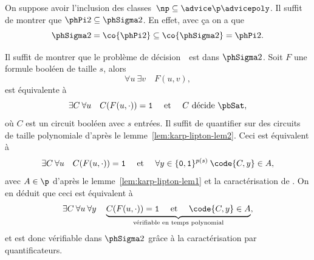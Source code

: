 \documentclass[./main]{subfiles}
\begin{document}
  \vspace{12pt}

  \begin{prv}
    On suppose avoir l'inclusion des classes~$\np \subseteq \advice \p \advicepoly$.
    Il suffit de montrer que $\phPi 2 \subseteq \phSigma 2$.
    En effet, avec ça on a que
    \[
      \phSigma 2 = \co {\phPi 2} \subseteq \co {\phSigma 2} = \phPi 2
    .\]

    \renewcommand\vali{2}%

    Il suffit de montrer que le problème de décision~\pbQBFPi\ est dans $\phSigma 2$.
    Soit $F$ une formule booléen de taille $s$, alors
    \[
    \forall u \: \exists v \quad F(u, v)
    ,\] 
    est équivalente à 
    \[
    \exists C \: \forall u \quad C(F(u, \cdot)) = \texttt{1} \quad \text{ et }\quad \text{$C$ décide \pbSat}
    ,\]
    où $C$ est un circuit booléen avec $s$ entrées.
    Il suffit de quantifier sur des circuits de taille polynomiale d'après le lemme~\ref{lem:karp-lipton-lem2}.
    Ceci est équivalent à 
    \[
      \exists C \: \forall u \quad C(F(u, \cdot)) = \texttt{1} \quad \text{ et } \quad \forall y \in \{\texttt{0},\texttt{1}\}^{p(s)} \: \code{C, y} \in A
    ,\] 
    avec $A \in \p$ d'après le lemme~\ref{lem:karp-lipton-lem1} et la caractérisation de \conp.
    On en déduit que ceci est équivalent à 
    \[
      \exists C \: \forall u \: \forall y \quad \underbrace{C(F(u, \cdot )) = \texttt{1} \quad \text{ et } \quad \code{C, y} \in A}_{\text{vérifiable en temps polynomial}}
    ,\]
    et est donc vérifiable dans $\phSigma 2$ grâce à la caractérisation par quantificateurs.
  \end{prv}

  \renewcommand\vali{i}%
\end{document}
